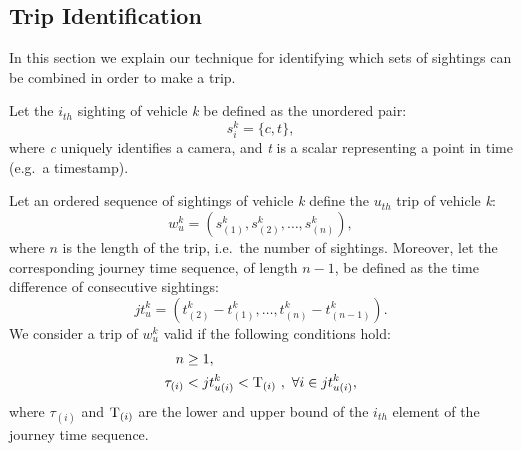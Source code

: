 \subsection{Trip Identification}\label{s.trips}

In this section we explain our technique for identifying which sets of sightings can be combined in order to make a trip.

Let the $i_{th}$ sighting of vehicle \emph{k} be defined as the unordered pair:
\begin{equation} \label{e.sighting}
s^{k}_{i} = \{ c, t \},
\end{equation}
where \emph{c} uniquely identifies a camera, and \emph{t} is a scalar representing a point in time (e.g.\ a timestamp).

Let an ordered sequence of sightings of vehicle \emph{k} define the $u_{th}$ trip of vehicle \emph{k}:
\begin{equation} \label{e.trip}
w^{k}_{u} = \left(s^{k}_{(1)}, s^{k}_{(2)}, \dots , s^{k}_{(n)}\right),
\end{equation}
where \( n \) is the length of the trip, i.e.\ the number of sightings. Moreover, let the corresponding journey time sequence, of length \(n-1\), be defined as the time difference of consecutive sightings:
\begin{equation} \label{e.journeytime}
jt^{k}_{u} = \left(t^{k}_{(2)} - t^{k}_{(1)}, \ldots, t^{k}_{(n)} - t^{k}_{(n-1)} \right).
\end{equation}
We consider a trip of \emph{$w^k_u$} valid if the following conditions hold:
\begin{align}
n &\ge 1 , \label{e.trip.constraints.1} \\
\tau_{(i)} &< jt^{k}_{u(i)} < \mathrm{T}_{(i)} \ , \ \forall i \in jt^{k}_{u(i)} \label{e.trip.constraints.2},
\end{align}
where $\tau_{(i)}$ and $\mathrm{T}_{(i)}$ are the lower and upper bound of the $i_{th}$ element of the journey time sequence.

